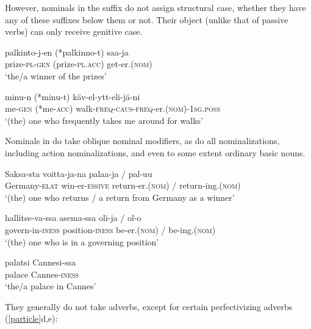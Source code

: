 \documentclass[output=paper,
modfonts
]{LSP/langsci}
\newcommand{\rfa}[2]{(\ref{#1}{#2})}
\begin{document}
 However, nominals in the suffix  do not assign structural
case,  whether they have any of these suffixes below them or not.  Their object
 (unlike that of passive verbs) can only receive genitive case.
\begin{exe}
\ex
\ea \gll palkinto-j-en (*palkinno-t) saa-ja \\
prize-\textsc{pl}-\textsc{gen} (prize-\textsc{pl}.\textsc{acc}) get-er.(\textsc{nom})\\
\glt `the/a winner of the prizes'

\ex \gll minu-n (*minu-t) käv-el-ytt-eli-jä-ni \\
me-\textsc{gen} (*me-\textsc{acc}) walk-\textsc{freq}-\textsc{caus}-\textsc{freq}-er.(\textsc{nom})-\textsc{1sg}.\textsc{poss}\\
\glt `(the) one who frequently takes me around for walks'  
\z
\end{exe}
Nominals in  do take oblique nominal modifiers, as do all nominalizations, including
action nominalizations, and even to some extent ordinary basic nouns.
\begin{exe}
\ex\label{cann}
	\ea \gll Saksa-sta voitta-ja-na palaa-ja / pal-uu \\
    Germany-\textsc{elat} win-er-\textsc{essive} return-er.(\textsc{nom}) / return-ing.(\textsc{nom})\\
    \glt `(the) one who returns / a return from Germany as a winner' 
 
	\ex \gll hallitse-va-ssa asema-ssa oli-ja / ol-o \\
govern-in-\textsc{iness} position-\textsc{iness} be-er.(\textsc{nom}) / be-ing.(\textsc{nom}) \\
\glt `(the) one who is in a governing position'

  	\ex \gll palatsi Cannesi-ssa\\
    palace     Cannes-\textsc{iness}\\
    \glt `the/a palace in Cannes'
    \z 
\end{exe}
They generally do not take adverbs, except for certain perfectivizing adverbs \rfa{particle}{d,e}:
\end{document}
